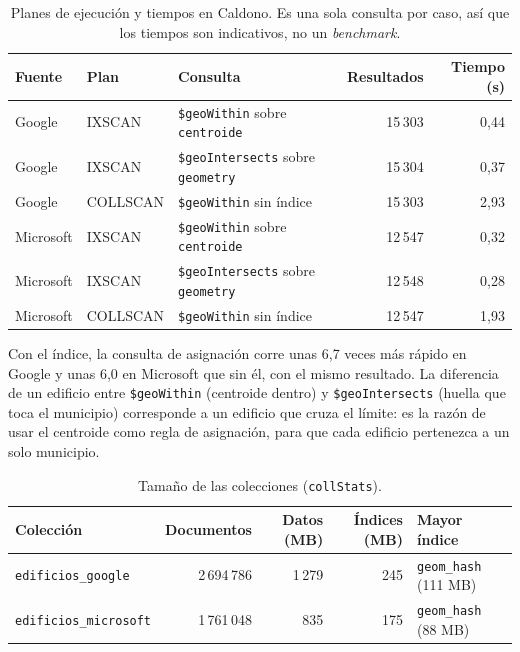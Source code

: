 \documentclass[11pt,a4paper]{article}
\newcommand{\campo}[1]{\texttt{#1}}
\begin{document}
\begin{table}[H]
\centering\small
\begin{tabularx}{\textwidth}{@{}llLrr@{}}
\toprule
\textbf{Fuente} & \textbf{Plan} & \textbf{Consulta} & \textbf{Resultados} & \textbf{Tiempo (s)} \\
\midrule
Google    & IXSCAN   & \campo{\$geoWithin} sobre \campo{centroide}   & 15\,303 & 0,44 \\
Google    & IXSCAN   & \campo{\$geoIntersects} sobre \campo{geometry} & 15\,304 & 0,37 \\
Google    & COLLSCAN & \campo{\$geoWithin} sin índice                 & 15\,303 & 2,93 \\
Microsoft & IXSCAN   & \campo{\$geoWithin} sobre \campo{centroide}   & 12\,547 & 0,32 \\
Microsoft & IXSCAN   & \campo{\$geoIntersects} sobre \campo{geometry} & 12\,548 & 0,28 \\
Microsoft & COLLSCAN & \campo{\$geoWithin} sin índice                 & 12\,547 & 1,93 \\
\bottomrule
\end{tabularx}
\caption{Planes de ejecución y tiempos en Caldono. Es una sola consulta por
caso, así que los tiempos son indicativos, no un \emph{benchmark}.}
\label{tab:evidencia-edif}
\end{table}

Con el índice, la consulta de asignación corre unas 6,7 veces más rápido en
Google y unas 6,0 en Microsoft que sin él, con el mismo resultado. La
diferencia de un edificio entre \campo{\$geoWithin} (centroide dentro) y
\campo{\$geoIntersects} (huella que toca el municipio) corresponde a un
edificio que cruza el límite: es la razón de usar el centroide como regla de
asignación, para que cada edificio pertenezca a un solo municipio.

\begin{table}[H]
\centering\small
\begin{tabularx}{\textwidth}{@{}lrrrL@{}}
\toprule
\textbf{Colección} & \textbf{Documentos} & \textbf{Datos (MB)} & \textbf{Índices (MB)} & \textbf{Mayor índice} \\
\midrule
\campo{edificios\_google}    & 2\,694\,786 & 1\,279 & 245 & \campo{geom\_hash} (111 MB) \\
\campo{edificios\_microsoft} & 1\,761\,048 & 835    & 175 & \campo{geom\_hash} (88 MB) \\
\bottomrule
\end{tabularx}
\caption{Tamaño de las colecciones (\campo{collStats}).}
\label{tab:tamano-edif}
\end{table}
\end{document}
